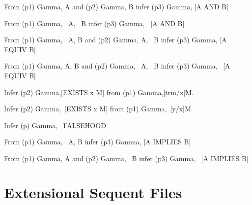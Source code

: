 \begin{description} 
\item[AND+]  
From
(p1) Gamma, A
and
(p2) Gamma, B
infer
(p3) Gamma, [A AND B]

\item[AND-]  
From
(p1) Gamma, ~A, ~B
infer
(p3) Gamma, ~[A AND B]

\item[EQUIV+]  
From
(p1) Gamma, ~A, B
and
(p2) Gamma, A, ~B
infer
(p3) Gamma, [A EQUIV B]

\item[EQUIV-]  
From
(p1) Gamma, A, B
and
(p2) Gamma, ~A, ~B
infer
(p3) Gamma, ~[A EQUIV B]

\item[EXISTS+]  
Infer (p2) Gamma,[EXISTS x M] from (p1) Gamma,[trm/x]M.

\item[EXISTS-]  
Infer (p2) Gamma,~[EXISTS x M] from (p1) Gamma,~[y/x]M.

\item[FALSE-]  
Infer (p) Gamma, ~FALSEHOOD

\item[IMPLIES+]  
From
(p1) Gamma, ~A, B
infer
(p3) Gamma, [A IMPLIES B]

\item[IMPLIES-]  
From
(p1) Gamma, A
and
(p2) Gamma, ~B
infer
(p3) Gamma, ~[A IMPLIES B]
\item
\end{description}

\section{Extensional Sequent Files}

